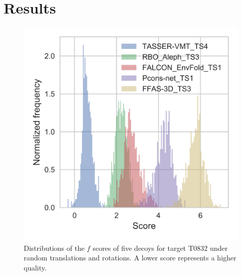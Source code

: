 \documentclass{bioinfo}
\begin{document}
\section{Results}
%
%
\begin{figure}[!tpb]
    \centering
    \includegraphics[width=\linewidth]{image5}
    \caption{Distributions of the $f$ scores of five decoys for target
    T0832 under random translations and rotations. A lower score
    represents a higher quality.}
    \label{Fig:DecoysScoreDistribution}
\end{figure}
%
\end{document}
